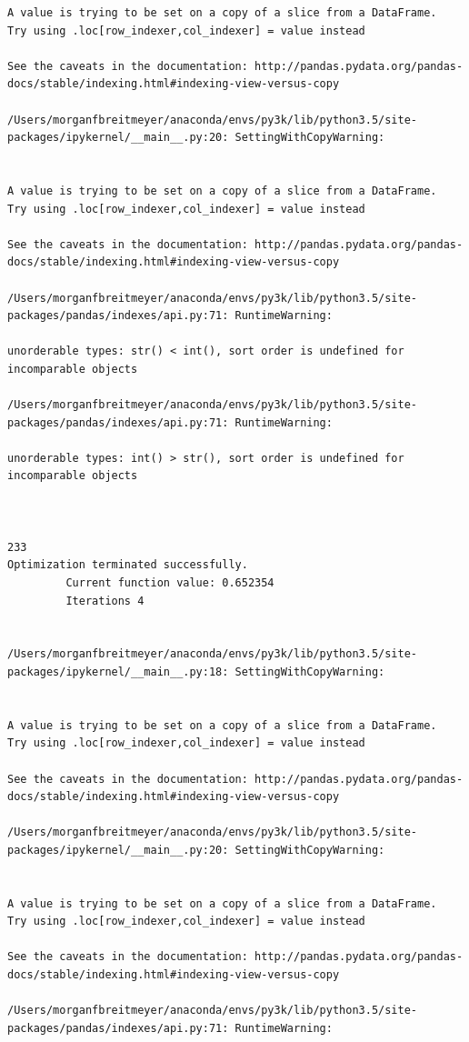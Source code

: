 \begin{lstlisting}
A value is trying to be set on a copy of a slice from a DataFrame.
Try using .loc[row_indexer,col_indexer] = value instead

See the caveats in the documentation: http://pandas.pydata.org/pandas-docs/stable/indexing.html#indexing-view-versus-copy

/Users/morganfbreitmeyer/anaconda/envs/py3k/lib/python3.5/site-packages/ipykernel/__main__.py:20: SettingWithCopyWarning:


A value is trying to be set on a copy of a slice from a DataFrame.
Try using .loc[row_indexer,col_indexer] = value instead

See the caveats in the documentation: http://pandas.pydata.org/pandas-docs/stable/indexing.html#indexing-view-versus-copy

/Users/morganfbreitmeyer/anaconda/envs/py3k/lib/python3.5/site-packages/pandas/indexes/api.py:71: RuntimeWarning:

unorderable types: str() < int(), sort order is undefined for incomparable objects

/Users/morganfbreitmeyer/anaconda/envs/py3k/lib/python3.5/site-packages/pandas/indexes/api.py:71: RuntimeWarning:

unorderable types: int() > str(), sort order is undefined for incomparable objects



233
Optimization terminated successfully.
         Current function value: 0.652354
         Iterations 4


/Users/morganfbreitmeyer/anaconda/envs/py3k/lib/python3.5/site-packages/ipykernel/__main__.py:18: SettingWithCopyWarning:


A value is trying to be set on a copy of a slice from a DataFrame.
Try using .loc[row_indexer,col_indexer] = value instead

See the caveats in the documentation: http://pandas.pydata.org/pandas-docs/stable/indexing.html#indexing-view-versus-copy

/Users/morganfbreitmeyer/anaconda/envs/py3k/lib/python3.5/site-packages/ipykernel/__main__.py:20: SettingWithCopyWarning:


A value is trying to be set on a copy of a slice from a DataFrame.
Try using .loc[row_indexer,col_indexer] = value instead

See the caveats in the documentation: http://pandas.pydata.org/pandas-docs/stable/indexing.html#indexing-view-versus-copy

/Users/morganfbreitmeyer/anaconda/envs/py3k/lib/python3.5/site-packages/pandas/indexes/api.py:71: RuntimeWarning:


\end{lstlisting}

